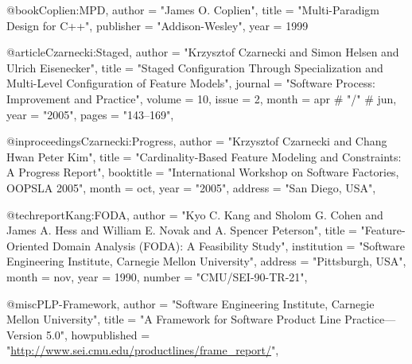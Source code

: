 @book{Coplien:MPD,
	author = "James O. Coplien",
	title = "Multi-Paradigm Design for C++",
	publisher = "Addison-Wesley",
	year = 1999
}

@article{Czarnecki:Staged,
    author = "Krzysztof Czarnecki and Simon Helsen and Ulrich Eisenecker",
    title = "Staged Configuration Through Specialization and Multi-Level Configuration of Feature Models",
    journal = "Software Process: Improvement and Practice",
    volume = 10,
    issue = 2,
    month = apr # "/" # jun,
    year = "2005",
    pages = "143--169",
}

@inproceedings{Czarnecki:Progress,
	author = "Krzysztof Czarnecki and Chang Hwan Peter Kim",
	title = "Cardinality-Based Feature Modeling and Constraints: A Progress Report",
	booktitle = "International Workshop on Software Factories, OOPSLA 2005",
	month = oct,
	year = "2005",
	address = "San Diego, USA",
}

@techreport{Kang:FODA,
	author = "Kyo C. Kang and Sholom G. Cohen and James A. Hess and William E. Novak and A. Spencer Peterson",
	title = "Feature-Oriented Domain Analysis ({FODA}): A Feasibility Study",
	institution = "Software Engineering Institute, Carnegie Mellon University",
	address = "Pittsburgh, USA",
	month = nov,
	year = 1990,
	number = "CMU/SEI-90-TR-21",
}

@misc{PLP-Framework,
	author = "Software Engineering Institute, Carnegie Mellon University",
	title = "A Framework for Software Product Line Practice---Version 5.0",
	howpublished = "\url{http://www.sei.cmu.edu/productlines/frame_report/}",
}